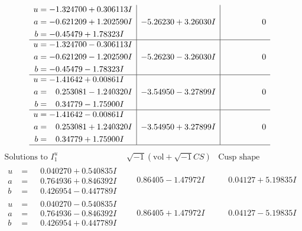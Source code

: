 \documentclass[1p]{elsarticle_modified}
\theoremstyle{definition}
\newcommand{\I}{\sqrt{-1}}
\begin{document}
$$\begin{array}{c|c|c}
\begin{aligned}
u &= -1.324700 + 0.306113 I \\
a &= -0.621209 + 1.202590 I \\
b &= -0.45479 + 1.78323 I\end{aligned}
 & -5.26230 + 3.26030 I & \phantom{-0.000000 } 0 \\ \hline\begin{aligned}
u &= -1.324700 - 0.306113 I \\
a &= -0.621209 - 1.202590 I \\
b &= -0.45479 - 1.78323 I\end{aligned}
 & -5.26230 - 3.26030 I & \phantom{-0.000000 } 0 \\ \hline\begin{aligned}
u &= -1.41642 + 0.00861 I \\
a &= \phantom{-}0.253081 - 1.240320 I \\
b &= \phantom{-}0.34779 - 1.75900 I\end{aligned}
 & -3.54950 - 3.27899 I & \phantom{-0.000000 } 0 \\ \hline\begin{aligned}
u &= -1.41642 - 0.00861 I \\
a &= \phantom{-}0.253081 + 1.240320 I \\
b &= \phantom{-}0.34779 + 1.75900 I\end{aligned}
 & -3.54950 + 3.27899 I & \phantom{-0.000000 } 0\\
 \hline 
 \end{array}$$\newpage$$\begin{array}{c|c|c}  
\text{Solutions to }I^u_{1}& \I (\text{vol} + \sqrt{-1}CS) & \text{Cusp shape}\\
 \hline 
\begin{aligned}
u &= \phantom{-}0.040270 + 0.540835 I \\
a &= \phantom{-}0.764936 + 0.846392 I \\
b &= \phantom{-}0.426954 - 0.447789 I\end{aligned}
 & \phantom{-}0.86405 - 1.47972 I & \phantom{-}0.04127 + 5.19835 I \\ \hline\begin{aligned}
u &= \phantom{-}0.040270 - 0.540835 I \\
a &= \phantom{-}0.764936 - 0.846392 I \\
b &= \phantom{-}0.426954 + 0.447789 I\end{aligned}
 & \phantom{-}0.86405 + 1.47972 I & \phantom{-}0.04127 - 5.19835 I \\ \hline\begin{aligned}

\end{aligned}
\end{array}$$
\end{document}
